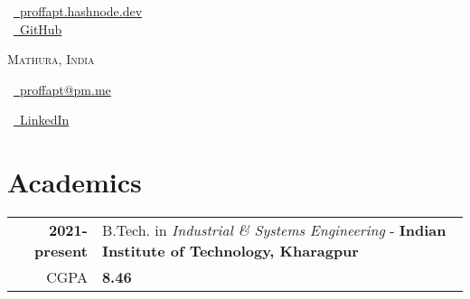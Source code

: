 \documentclass[a4paper,10pt]{extarticle} %
\begin{document}
\pagestyle{empty} %

\begin{multicols}{3}

\normalsize  \faGlobe\ {\href{https://proffapt.hashnode.dev/}{\  proffapt.hashnode.dev}}\\
\normalsize \faGithub\ {\href{https://github.com/proffapt}{\  GitHub}}\\
\columnbreak
\normalsize\par{\centering{\huge\textsc{\textcolor{primary}{Arpit Bhardwaj}}}\par} 
\par{\centering\normalsize {\textsc{Mathura, India}}\hfill\par}
\columnbreak
\raggedright\hfill\normalsize \faEnvelope\ {\href{mailto:proffapt@pm.me}{\  proffapt@pm.me}}\\
\raggedright\hfill\normalsize \faLinkedinSquare\ {\href{https://www.linkedin.com/in/proffapt}{\  LinkedIn}}\\
\end{multicols}
\vspace{-0.4 cm}

\section{\textcolor{primary}{Academics}}
\vspace{+0.1cm}

\begin{tabular}{r|p{17.5cm}}	

 \textbf{2021-present} & B.Tech. in \textit{Industrial \& Systems Engineering} - \textbf{Indian Institute of Technology, Kharagpur}\\
 \hfill CGPA & \textbf{8.46}\\
 
\end{tabular}

\vspace{+0.2cm}
\end{document}
